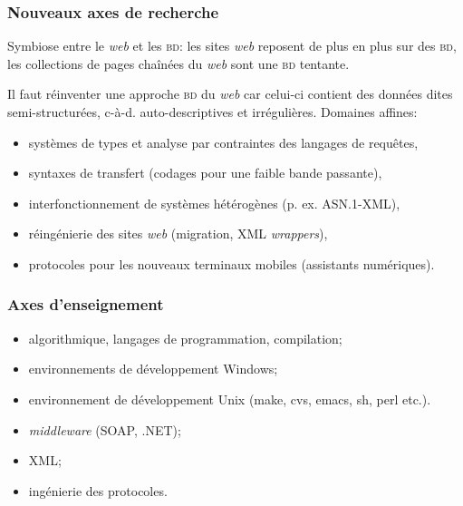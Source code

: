 \documentclass[compress,dvips,xcolor={dvipsnames},t]{beamer}
\begin{document}
\begin{frame}
\frametitle{Nouveaux axes de recherche}

Symbiose entre le \emph{web} et les \textsc{bd}: les sites \emph{web}
reposent de plus en plus sur des \textsc{bd}, les collections de pages
chaînées du \emph{web} sont une \textsc{bd} tentante.

Il faut réinventer une approche \textsc{bd} du \emph{web} car celui-ci
contient des données dites semi-structurées, c-à-d. auto-descriptives
et irrégulières. Domaines affines:

\begin{itemize}

  \item systèmes de types et analyse par contraintes des langages de
        requêtes,

  \item syntaxes de transfert (codages pour une faible bande passante),

  \item interfonctionnement de systèmes hétérogènes (p. ex. ASN.1-XML),

  \item réingénierie des sites \emph{web} (migration, XML
        \emph{wrappers}),

  \item protocoles pour les nouveaux terminaux mobiles (assistants
        numériques).

\end{itemize}

\end{frame}



\begin{frame}
\frametitle{Axes d'enseignement}

\begin{itemize}

  \item algorithmique, langages de programmation, compilation;

  \item environnements de développement Windows;

  \item environnement de développement Unix (\textsf{make},
        \textsf{cvs}, \textsf{emacs}, \textsf{sh}, \textsf{perl}
        etc.).

  \item \emph{middleware} (SOAP, .NET);

  \item XML;

  \item ingénierie des protocoles.

\end{itemize}

\end{frame}
\end{document}
